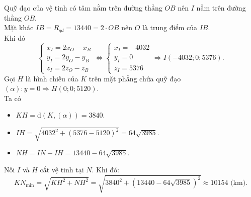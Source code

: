 \begin{ex}
{\begin{itemchoice}
		\itemch
		Quỹ đạo của vệ tinh có tâm nằm trên đường thẳng $OB$ nên $I$ nằm trên đường thẳng $OB$.\\
		Mặt khác $IB=R_{qd}=13440=2\cdot OB$ nên $O$ là trung điểm của $IB$.\\
		Khi đó
		$$\begin{cases}
			x_I=2x_O-x_B \\
			y_I=2y_O-y_B \\
			z_I=2z_O-z_B
		\end{cases}
		\Leftrightarrow
		\begin{cases}
			x_I=-4032\\
			y_I=0\\
		z_I=5376\end{cases}
		\Rightarrow I(-4032; 0; 5376).$$
		\itemch
		Gọi $H$ là hình chiếu của $K$ trên mặt phẳng chứa quỹ đạo $(\alpha)\colon y=0\Rightarrow H(0; 0; 5120)$.\\
		Ta có
		\begin{itemize}
			\item $KH=\mathrm{d}(K, (\alpha))=3840$.
			\item $IH=\sqrt{4032^2+(5376-5120)^2}=64\sqrt{3985}$.
			\item $NH=IN-IH=13440-64\sqrt{3985}$.
		\end{itemize}
		Nối $I$ và $H$ cắt vệ tinh tại $N$. Khi đó:
		$$KN_{\text{min}}=\sqrt{KH^2+NH^2}=\sqrt{3840^2+(13440-64\sqrt{3985})^2} \approx 10154 \text{ (km)}.$$
		
	\end{itemchoice}
	}
\end{ex}


